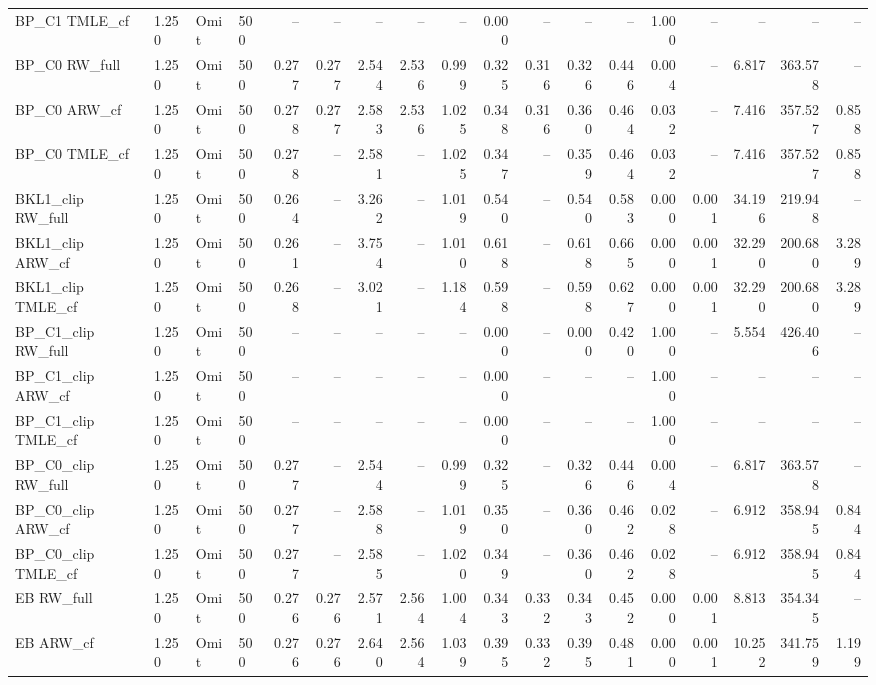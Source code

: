 \begin{tabular}{llllrrrrrrrrrrrrrr}
BP\_C1 TMLE\_cf & 1.250 & Omit & 500 & -- & -- & -- & -- & -- & 0.000 & -- & -- & -- & 1.000 & -- & -- & -- & -- \\
BP\_C0 RW\_full & 1.250 & Omit & 500 & 0.277 & 0.277 & 2.544 & 2.536 & 0.999 & 0.325 & 0.316 & 0.326 & 0.446 & 0.004 & -- & 6.817 & 363.578 & -- \\
BP\_C0 ARW\_cf & 1.250 & Omit & 500 & 0.278 & 0.277 & 2.583 & 2.536 & 1.025 & 0.348 & 0.316 & 0.360 & 0.464 & 0.032 & -- & 7.416 & 357.527 & 0.858 \\
BP\_C0 TMLE\_cf & 1.250 & Omit & 500 & 0.278 & -- & 2.581 & -- & 1.025 & 0.347 & -- & 0.359 & 0.464 & 0.032 & -- & 7.416 & 357.527 & 0.858 \\
BKL1\_clip RW\_full & 1.250 & Omit & 500 & 0.264 & -- & 3.262 & -- & 1.019 & 0.540 & -- & 0.540 & 0.583 & 0.000 & 0.001 & 34.196 & 219.948 & -- \\
BKL1\_clip ARW\_cf & 1.250 & Omit & 500 & 0.261 & -- & 3.754 & -- & 1.010 & 0.618 & -- & 0.618 & 0.665 & 0.000 & 0.001 & 32.290 & 200.680 & 3.289 \\
BKL1\_clip TMLE\_cf & 1.250 & Omit & 500 & 0.268 & -- & 3.021 & -- & 1.184 & 0.598 & -- & 0.598 & 0.627 & 0.000 & 0.001 & 32.290 & 200.680 & 3.289 \\
BP\_C1\_clip RW\_full & 1.250 & Omit & 500 & -- & -- & -- & -- & -- & 0.000 & -- & 0.000 & 0.420 & 1.000 & -- & 5.554 & 426.406 & -- \\
BP\_C1\_clip ARW\_cf & 1.250 & Omit & 500 & -- & -- & -- & -- & -- & 0.000 & -- & -- & -- & 1.000 & -- & -- & -- & -- \\
BP\_C1\_clip TMLE\_cf & 1.250 & Omit & 500 & -- & -- & -- & -- & -- & 0.000 & -- & -- & -- & 1.000 & -- & -- & -- & -- \\
BP\_C0\_clip RW\_full & 1.250 & Omit & 500 & 0.277 & -- & 2.544 & -- & 0.999 & 0.325 & -- & 0.326 & 0.446 & 0.004 & -- & 6.817 & 363.578 & -- \\
BP\_C0\_clip ARW\_cf & 1.250 & Omit & 500 & 0.277 & -- & 2.588 & -- & 1.019 & 0.350 & -- & 0.360 & 0.462 & 0.028 & -- & 6.912 & 358.945 & 0.844 \\
BP\_C0\_clip TMLE\_cf & 1.250 & Omit & 500 & 0.277 & -- & 2.585 & -- & 1.020 & 0.349 & -- & 0.360 & 0.462 & 0.028 & -- & 6.912 & 358.945 & 0.844 \\
EB RW\_full & 1.250 & Omit & 500 & 0.276 & 0.276 & 2.571 & 2.564 & 1.004 & 0.343 & 0.332 & 0.343 & 0.452 & 0.000 & 0.001 & 8.813 & 354.345 & -- \\
EB ARW\_cf & 1.250 & Omit & 500 & 0.276 & 0.276 & 2.640 & 2.564 & 1.039 & 0.395 & 0.332 & 0.395 & 0.481 & 0.000 & 0.001 & 10.252 & 341.759 & 1.199 \\

\end{tabular}
